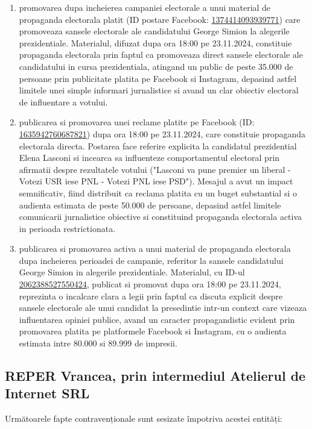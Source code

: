 \documentclass[a4paper,12pt]{article}
\begin{document}
\begin{enumerate}[leftmargin=*, label=\arabic*.)]
    \item promovarea dupa incheierea campaniei electorale a unui material de propaganda electorala platit (ID postare Facebook: \href{https://www.facebook.com/ads/library/?id=1374414093939771}{1374414093939771}) care promoveaza sansele electorale ale candidatului George Simion la alegerile prezidentiale. Materialul, difuzat dupa ora 18:00 pe 23.11.2024, constituie propaganda electorala prin faptul ca promoveaza direct sansele electorale ale candidatului in cursa prezidentiala, atingand un public de peste 35.000 de persoane prin publicitate platita pe Facebook si Instagram, depasind astfel limitele unei simple informari jurnalistice si avand un clar obiectiv electoral de influentare a votului.
    \item publicarea si promovarea unei reclame platite pe Facebook (ID: \href{https://www.facebook.com/ads/library/?id=1635942760687821}{1635942760687821}) dupa ora 18:00 pe 23.11.2024, care constituie propaganda electorala directa. Postarea face referire explicita la candidatul prezidential Elena Lasconi si incearca sa influenteze comportamentul electoral prin afirmatii despre rezultatele votului ("Lasconi va pune premier un liberal - Votezi USR iese PNL - Votezi PNL iese PSD"). Mesajul a avut un impact semnificativ, fiind distribuit ca reclama platita cu un buget substantial si o audienta estimata de peste 50.000 de persoane, depasind astfel limitele comunicarii jurnalistice obiective si constituind propaganda electorala activa in perioada restrictionata.
    \item publicarea si promovarea activa a unui material de propaganda electorala dupa incheierea perioadei de campanie, referitor la sansele candidatului George Simion in alegerile prezidentiale. Materialul, cu ID-ul \href{https://www.facebook.com/ads/library/?id=2062388527550424}{2062388527550424}, publicat si promovat dupa ora 18:00 pe 23.11.2024, reprezinta o incalcare clara a legii prin faptul ca discuta explicit despre sansele electorale ale unui candidat la presedintie intr-un context care vizeaza influentarea opiniei publice, avand un caracter propagandistic evident prin promovarea platita pe platformele Facebook si Instagram, cu o audienta estimata intre 80.000 si 89.999 de impresii.
\end{enumerate}

\vspace{0.5cm}

\subsection{REPER Vrancea, prin intermediul Atelierul de Internet SRL}
Următoarele fapte contravenționale sunt sesizate împotriva acestei entități:
\end{document}
